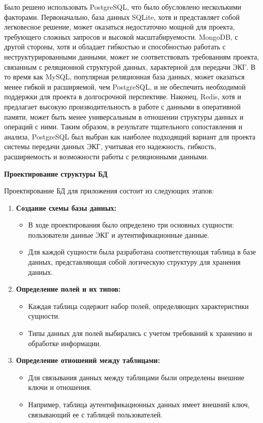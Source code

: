 \documentclass[12pt, russian]{extarticle}
\begin{document}
\begin{spacing}{1.5}
Было решено использовать PostgreSQL, что было обусловлено несколькими факторами. Первоначально, база данных SQLite, хотя и представляет собой легковесное решение, может оказаться недостаточно мощной для проекта, требующего сложных запросов и высокой масштабируемости. MongoDB, с другой стороны, хотя и обладает гибкостью и способностью работать с неструктурированными данными, может не соответствовать требованиям проекта, связанным с реляционной структурой данных, характерной для передачи ЭКГ. В то время как MySQL, популярная реляционная база данных, может оказаться менее гибкой и расширяемой, чем PostgreSQL, и не обеспечить необходимой поддержки для проекта в долгосрочной перспективе. Наконец, Redis, хотя и предлагает высокую производительность в работе с данными в оперативной памяти, может быть менее универсальным в отношении структуры данных и операций с ними. Таким образом, в результате тщательного сопоставления и анализа, PostgreSQL был выбран как наиболее подходящий вариант для проекта системы передачи данных ЭКГ, учитывая его надежность, гибкость, расширяемость и возможности работы с реляционными данными.

\par \noindent \textbf{Проектирование структуры БД}

Проектирование БД для приложения состоит из следующих этапов:

\begin{enumerate}
    \item \textbf{Создание схемы базы данных:}
        \begin{itemize}
            \item В ходе проектирования было определено три основных сущности: пользователи
                данные ЭКГ и аутентификационные данные.
            \item Для каждой сущности была разработана соответствующая таблица в базе данных,
                представляющая собой логическую структуру для хранения данных.
        \end{itemize}
    \item \textbf{Определение полей и их типов:}
        \begin{itemize}
            \item Каждая таблица содержит набор полей, определяющих характеристики сущности.
            \item Типы данных для полей выбирались с учетом требований к хранению и обработке информации.
        \end{itemize}
    \item \textbf{Определение отношений между таблицами:}
        \begin{itemize}
            \item Для связывания данных между таблицами были определены внешние ключи и отношения.
            \item Например, таблица аутентификационных данных имеет внешний ключ, связывающий ее с таблицей пользователей.
        \end{itemize}
\end{enumerate}


\end{spacing}
\end{document}
